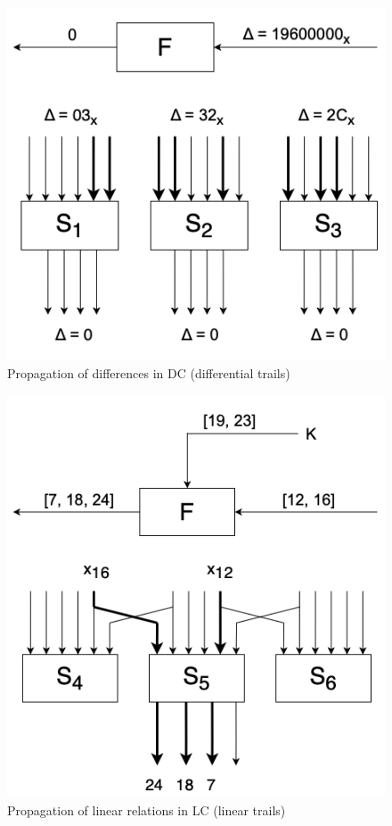 \documentclass{report}
\begin{document}
\begin{figure}[H]
    \centering
    \includegraphics[scale=0.5]{Shamir-DES.png}
    \caption{Propagation of differences in DC (differential trails)}
    \label{fig:diftrail}
\end{figure}

\begin{figure}[H]
    \centering
    \includegraphics[scale=0.5]{Matsui-DES.png}
    \caption{Propagation of linear relations in LC (linear trails)}
    \label{fig:lintrail}
\end{figure}
\end{document}
